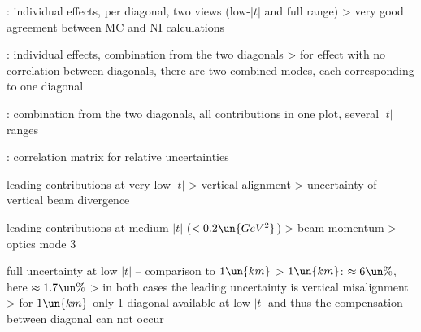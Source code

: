 \>  : individual effects, per diagonal, two views (low-$|t|$ and full range)
\>> very good agreement between MC and NI calculations

\>  : individual effects, combination from the two diagonals
\>> for effect with no correlation between diagonals, there are two combined modes, each corresponding to one diagonal

\>  : combination from the two diagonals, all contributions in one plot, several $|t|$ ranges

\>  : correlation matrix for relative uncertainties

\> leading contributions at very low $|t|$
\>> vertical alignment
\>> uncertainty of vertical beam divergence

\> leading contributions at medium $|t|$ ($< 0.2\un{GeV^2}$)
\>> beam momentum
\>> optics mode 3

\> full uncertainty at low $|t|$ -- comparison to $1\un{km}$
\>> $1\un{km}$: $\approx 6\un{\%}$, here $\approx 1.7\un{\%}$
\>> in both cases the leading uncertainty is vertical misalignment
\>> for $1\un{km}$ only 1 diagonal available at low $|t|$ and thus the compensation between diagonal can not occur

\fi



\EndText
\bye
